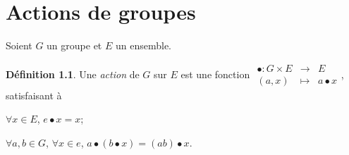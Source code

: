 \documentclass{report}
\theoremstyle{definition}
\newtheorem*{defin}{D\'efinition}
\theoremstyle{remark}
\begin{document}
	\chapter{Actions de groupes}
	Soient $G$ un groupe et $E$ un ensemble.
	\begin{defin}
		Une \emph{action} de $G$ sur $E$ est une fonction $\begin{array}{rcl}
			\bullet:G \times E&\to&E\\
			(a,x)&\mapsto&a \bullet x
		\end{array}$, satisfaisant \`a
		\begin{nlist}
			\item $\forall x \in E$, $e \bullet x = x$;
			\item $\forall a,b \in G$, $\forall x \in e$, $a \bullet (b \bullet x) = (ab) \bullet x$.
		\end{nlist}
	\end{defin}
\end{document}
